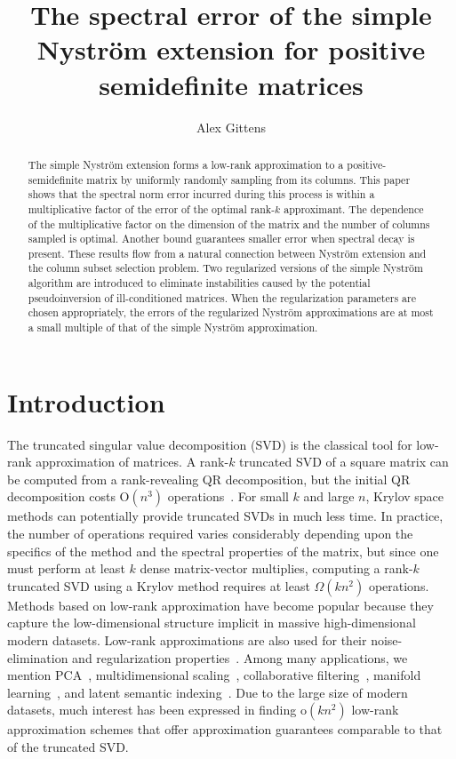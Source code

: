 \documentclass[11pt,letterpaper,twoside,reqno,nosumlimits]{amsart}
\title[The simple Nystr\"om extension]{The spectral error of the simple Nystr\"om extension for positive semidefinite matrices}
\author{Alex Gittens}
\newcommand{\const}[1]{\ensuremath{\mathrm{#1}}}
\theoremstyle{remark}
\begin{document}
\begin{abstract}The simple Nystr\"om extension forms a low-rank approximation to a positive-semidefinite matrix by uniformly randomly sampling from its columns. This paper shows that the spectral norm error incurred during this process is within a multiplicative factor of the error of the optimal rank-$k$ approximant. The dependence of the multiplicative factor on the dimension of the matrix and the number of columns sampled is optimal. Another bound guarantees smaller error when spectral decay is present. These results flow from a natural connection between Nystr\"om extension and the column subset selection problem. Two regularized versions of the simple Nystr\"om algorithm are introduced to eliminate instabilities caused by the potential pseudoinversion of ill-conditioned matrices. When the regularization parameters are chosen appropriately, the errors of the regularized Nystr\"om approximations are at most a small multiple of that of the simple Nystr\"om approximation.
\end{abstract}
\maketitle


\section{Introduction}
The truncated singular value decomposition (SVD) is the classical tool for low-rank approximation of matrices. A rank-$k$ truncated SVD of a square matrix can be computed from a rank-revealing QR decomposition, but the initial QR decomposition costs $\mathrm{O}(n^3)$ operations~\cite{CH92}. For small $k$ and large $n$, Krylov space methods can potentially provide truncated SVDs in much less time. In practice, the number of operations required varies considerably depending upon the specifics of the method and the spectral properties of the matrix, but since one must perform at least $k$ dense matrix-vector multiplies, computing a rank-$k$ truncated SVD using a Krylov method requires at least $\Omega(kn^2)$ operations. Methods based on low-rank approximation have become popular because they capture the low-dimensional structure implicit in massive high-dimensional modern datasets. Low-rank approximations are also used for their noise-elimination and regularization properties~\cite{H90}. Among many applications,
 we mention PCA~\cite{HTF08}, multidimensional scaling~\cite{CC00}, collaborative filtering~\cite{SAJ10}, manifold learning~\cite{HLMS04}, and latent semantic indexing~\cite{DDFLH90}. Due to the large size of modern datasets, much interest has been expressed in finding $\const{o}(kn^2)$ low-rank 
approximation schemes that offer approximation guarantees comparable to that of the truncated SVD.
\end{document}
